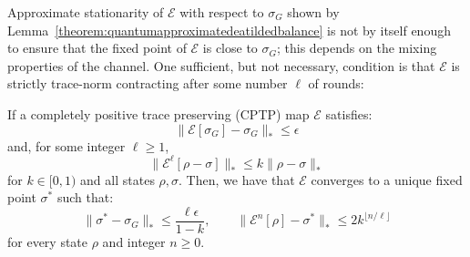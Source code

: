Approximate stationarity of $\mathcal{E}$ with respect to $\sigma_G$ shown by Lemma~\ref{theorem:quantumapproximatedeatildedbalance} is not by itself enough to ensure that the fixed point of $\mathcal{E}$ is close to $\sigma_G$; this depends on the mixing properties of the channel. One sufficient, but not necessary, condition is that $\mathcal{E}$ is strictly trace-norm contracting after some number $\ell$ of rounds:
 \begin{theorem}
     If a completely positive trace preserving (CPTP) map $\mathcal{E}$ satisfies:
     \begin{equation}
         \|\mathcal{E}[\sigma_G] - \sigma_G\|_* \leq \epsilon
     \end{equation}
     and, for some integer $\ell\geq1$,
 \begin{equation}
     \|\mathcal{E}^{\ell}[\rho-\sigma]\|_* \leq k\|\rho-\sigma\|_*
     \label{eq:contraction}
 \end{equation}
for $k \in [0,1)$ and all states $\rho, \sigma$. Then, we have that $\mathcal{E}$ converges to a unique fixed point $\sigma^*$ such that:
 \begin{equation}
     \| \sigma^* -\sigma_G\|_* \leq \frac{\ell\epsilon}{1-k},
     \qquad
     \|\mathcal{E}^n[\rho] -\sigma^*\|_* \leq 2k^{\lfloor n/\ell\rfloor}
 \end{equation}
 for every state $\rho$ and integer $n\geq0$.
 \label{theorem:error_bound}
 \end{theorem}
